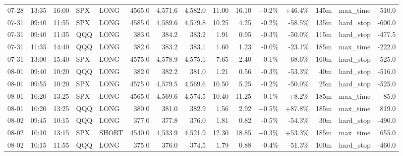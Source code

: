 \documentclass[11pt,a4paper,twoside]{article}
\begin{document}
\begin{landscape}
\begin{center}
\begin{longtable}{>{\color{txtmain}}l l l l l r r r r r r r r >{\color{txtmain}}l r}
07-28 & 13:35 & 16:00 & SPX & LONG & 4565.0 & 4,571.6 & 4,582.0 & 11.00 & 16.10 & \textcolor{wingreen}{+0.2\%} & \textcolor{wingreen}{+46.4\%} & 145m & max\_time & \textcolor{wingreen}{510.0} \\
07-31 & 09:40 & 11:55 & SPX & LONG & 4585.0 & 4,589.6 & 4,579.8 & 10.25 & 4.25 & \textcolor{lossred}{-0.2\%} & \textcolor{lossred}{-58.5\%} & 135m & hard\_stop & \textcolor{lossred}{-600.0} \\
07-31 & 09:40 & 11:35 & QQQ & LONG & 383.0 & 384.2 & 383.2 & 1.91 & 0.95 & \textcolor{lossred}{-0.3\%} & \textcolor{lossred}{-50.0\%} & 115m & hard\_stop & \textcolor{lossred}{-477.5} \\
07-31 & 11:35 & 14:40 & QQQ & LONG & 382.0 & 383.2 & 383.1 & 1.60 & 1.23 & \textcolor{lossred}{-0.0\%} & \textcolor{lossred}{-23.1\%} & 185m & max\_time & \textcolor{lossred}{-222.0} \\
07-31 & 13:00 & 15:40 & SPX & LONG & 4575.0 & 4,578.9 & 4,575.1 & 7.65 & 2.40 & \textcolor{lossred}{-0.1\%} & \textcolor{lossred}{-68.6\%} & 160m & hard\_stop & \textcolor{lossred}{-525.0} \\
08-01 & 09:40 & 10:20 & QQQ & LONG & 382.0 & 382.2 & 381.0 & 1.21 & 0.56 & \textcolor{lossred}{-0.3\%} & \textcolor{lossred}{-53.3\%} & 40m & hard\_stop & \textcolor{lossred}{-516.0} \\
08-01 & 09:55 & 10:20 & SPX & LONG & 4575.0 & 4,579.5 & 4,569.6 & 10.50 & 5.25 & \textcolor{lossred}{-0.2\%} & \textcolor{lossred}{-50.0\%} & 25m & hard\_stop & \textcolor{lossred}{-525.0} \\
08-01 & 10:20 & 13:25 & SPX & LONG & 4565.0 & 4,569.6 & 4,574.5 & 10.40 & 11.25 & \textcolor{wingreen}{+0.1\%} & \textcolor{wingreen}{+8.2\%} & 185m & max\_time & \textcolor{wingreen}{85.0} \\
08-01 & 10:20 & 13:25 & QQQ & LONG & 380.0 & 381.0 & 382.9 & 1.56 & 2.92 & \textcolor{wingreen}{+0.5\%} & \textcolor{wingreen}{+87.8\%} & 185m & max\_time & \textcolor{wingreen}{819.0} \\
08-02 & 09:45 & 10:15 & QQQ & LONG & 377.0 & 377.8 & 376.0 & 1.81 & 0.82 & \textcolor{lossred}{-0.5\%} & \textcolor{lossred}{-54.3\%} & 30m & hard\_stop & \textcolor{lossred}{-490.0} \\
08-02 & 10:10 & 13:15 & SPX & SHORT & 4540.0 & 4,533.9 & 4,521.9 & 12.30 & 18.85 & \textcolor{wingreen}{+0.3\%} & \textcolor{wingreen}{+53.3\%} & 185m & max\_time & \textcolor{wingreen}{655.0} \\
08-02 & 10:15 & 11:55 & QQQ & LONG & 375.0 & 376.0 & 374.5 & 1.79 & 0.88 & \textcolor{lossred}{-0.4\%} & \textcolor{lossred}{-51.3\%} & 100m & hard\_stop & \textcolor{lossred}{-460.0} \\

\end{longtable}
\end{center}
\end{landscape}
\end{document}
